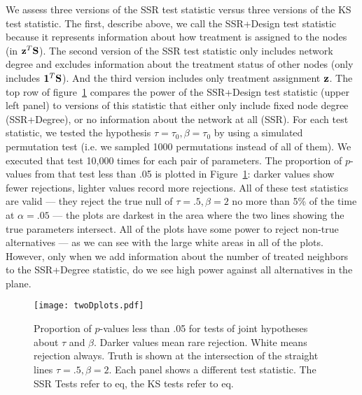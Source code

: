 We assess three versions of the SSR test statistic versus three versions of
the KS test statistic. The first, describe above, we call the SSR+Design test
statistic because it represents information about how treatment is assigned to
the nodes (in $\mathbf{z}^T \mathbf{S}$). The second version of the SSR test statistic only
includes network degree and excludes information about the treatment status of
other nodes (only includes $\mathbf{1}^T \mathbf{S}$). And the third version includes only
treatment assignment $\mathbf{z}$. The top row of figure~\ref{fig:twoD} compares the
power of the SSR+Design test statistic (upper left panel) to versions of this
statistic that either only include fixed node degree (SSR+Degree), or no
information about the network at all (SSR). For each test statistic, we tested
the hypothesis $\tau=\tau_0,\beta=\tau_0$ by using a simulated permutation
test (i.e. we sampled 1000 permutations instead of all of them). We executed that
test 10,000 times for each pair of parameters.  The proportion of $p$-values
from that test less than .05 is plotted in Figure~\ref{fig:twoD}: darker
values show fewer rejections, lighter values record more rejections.  All of
these test statistics are valid --- they reject the true null of
$\tau=.5,\beta=2$ no more than 5\% of the time at $\alpha=.05$ --- the plots
are darkest in the area where the two lines showing the true parameters
intersect. All of the plots have some power to reject non-true alternatives
--- as we can see with the large white areas in all of the plots. However,
only when we add information about the number of treated neighbors to the
SSR+Degree statistic, do we see high power against all alternatives in the
plane.


\begin{figure}[h!]
\centering
\texttt{[image: twoDplots.pdf]}
\caption{Proportion of $p$-values less than .05 for tests of joint hypotheses
about $\tau$ and $\beta$. Darker values mean rare rejection. White means
rejection always. Truth is shown at the intersection of the straight
lines  $\tau=.5, \beta=2$. Each panel shows a different test statistic. The
SSR Tests refer to eq, the KS tests refer to eq.  }\label{fig:twoD}
\end{figure}

